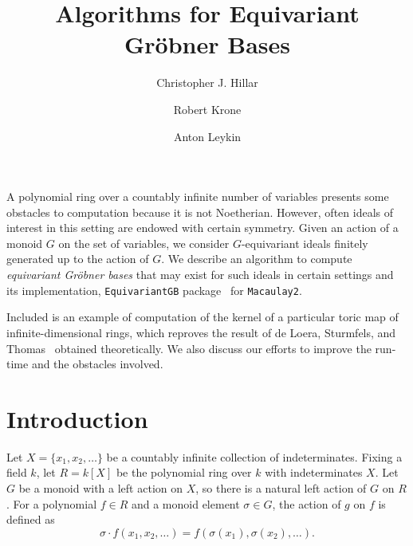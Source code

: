 \documentclass[10pt]{amsart}
\theoremstyle{definition}
\theoremstyle{remark}
\numberwithin{equation}{section}
\newcommand{\<}{\langle}
\renewcommand{\>}{\rangle}
\begin{document}
 \title[Algorithms for Equivariant Gr\"obner Bases]
{Algorithms for Equivariant Gr\"obner Bases}

\author{Christopher J. Hillar}
\address{Redwood Center for Theoretical Neuroscience, University of California, Berkeley}

\author{Robert Krone}
\address{Georgia Institute of Technology, Atlanta, GA}

\author{Anton Leykin}
\address{Georgia Institute of Technology, Atlanta, GA}


%




\maketitle

 A polynomial ring over a countably infinite number of variables presents some obstacles to computation because it is not Noetherian.  However, often ideals of interest in this setting are endowed with certain symmetry.  Given an action of a monoid $G$ on the set of variables, we consider $G$-equivariant ideals finitely generated up to the action of $G$. We describe an algorithm to compute {\em equivariant Gr\"obner bases} that may exist for such ideals in certain settings and its implementation, {\tt EquivariantGB} package~\cite{EquivariantGB} for {\tt Macaulay2}.
 
 Included is an example of computation of the kernel of a particular toric map of infinite-dimensional rings, which reproves the result of de Loera, Sturmfels, and Thomas~\cite{deLoera-Sturmfels-Thomas} obtained theoretically. We also discuss our efforts to improve the run-time and the obstacles involved.

\section{Introduction}
Let $X = \{x_1,x_2,\ldots\}$ be a countably infinite collection of indeterminates.  Fixing a field $k$, let $R = k[X]$ be the polynomial ring over $k$ with indeterminates $X$.  Let $G$ be a monoid with a left action on $X$, so there is a natural left action of $G$ on $R$.  For a polynomial $f \in R$ and a monoid element $\sigma \in G$, the action of $g$ on $f$ is defined as
 \[ \sigma\cdot f(x_1,x_2,\ldots) = f(\sigma(x_1),\sigma(x_2),\ldots). \]
\end{document}
